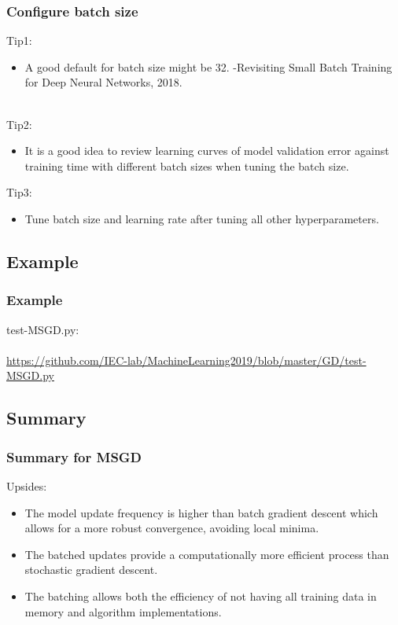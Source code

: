 \documentclass[cjk]{beamer}
\begin{document}
\begin{CJK*}{GBK}{kai}
\begin{frame}
\frametitle{Configure batch size}
\begin{block}{}
Tip1:
\begin{itemize}
\item A good default for batch size might be 32. \quad-Revisiting Small Batch Training for Deep Neural Networks, 2018.
\end{itemize}
~\\
Tip2:
\begin{itemize}
\item  It is a good idea to review learning curves of model validation error against training time with different batch sizes when tuning the batch size. 
\end{itemize}
Tip3:
\begin{itemize}
\item  Tune batch size and learning rate after tuning all other hyperparameters. 
\end{itemize}
\end{block}
\end{frame}

\subsection{Example}
\begin{frame}
\frametitle{Example}
test-MSGD.py:\\
~\\
\url{https://github.com/IEC-lab/MachineLearning2019/blob/master/GD/test-MSGD.py}
\end{frame}

\subsection{Summary}
\begin{frame}
\frametitle{Summary for MSGD}
Upsides:
\begin{itemize}
	\item The model update frequency is higher than batch gradient descent which allows for a more robust convergence, avoiding local minima.
	\item The batched updates provide a computationally more efficient process than stochastic gradient descent.
	\item The batching allows both the efficiency of not having all training data in memory and algorithm implementations.
\end{itemize}
\end{frame}


\end{CJK*}
\end{document}
